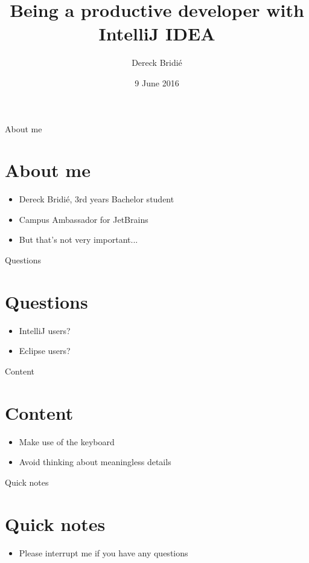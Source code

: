 \documentclass{beamer}
\title{Being a productive developer with IntelliJ IDEA}
\author{Dereck Bridi\'e}
\date{9 June 2016}
\begin{document}
\begin{frame}
\maketitle
\end{frame}

\begin{frame}{About me}
\section{About me}
\begin{itemize}
    \item Dereck Bridi\'e, 3rd years Bachelor student
    \item Campus Ambassador for JetBrains
    \pause
    \item But that's not very important...
\end{itemize}
\end{frame}

\begin{frame}{Questions}
\section{Questions}
\begin{itemize}
    \item IntelliJ users?
    \item Eclipse users?
\end{itemize}
\end{frame}

\begin{frame}{Content}
\section{Content}
\begin{itemize}
    \item Make use of the keyboard
    \item Avoid thinking about meaningless details
\end{itemize}
\end{frame}

\begin{frame}{Quick notes}
\section{Quick notes}
\begin{itemize}
    \item Please interrupt me if you have any questions
\end{itemize}
\end{frame}
\end{document}
